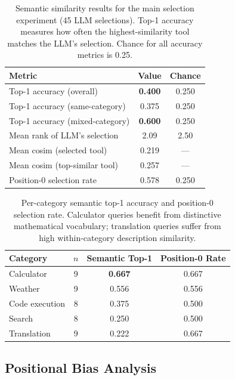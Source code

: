 \begin{table}[t]
\centering
\caption{Semantic similarity results for the main selection experiment (45 LLM selections).
         Top-1 accuracy measures how often the highest-similarity tool matches the LLM's
         selection.  Chance for all accuracy metrics is 0.25.}
\label{tab:semantic_overall}
\begin{tabular}{@{}lcc@{}}
\toprule
\textbf{Metric} & \textbf{Value} & \textbf{Chance} \\
\midrule
Top-1 accuracy (overall)          & \textbf{0.400} & 0.250 \\
Top-1 accuracy (same-category)    & 0.375          & 0.250 \\
Top-1 accuracy (mixed-category)   & \textbf{0.600} & 0.250 \\
Mean rank of LLM's selection      & 2.09           & 2.50  \\
Mean cosim (selected tool)        & 0.219          & ---   \\
Mean cosim (top-similar tool)     & 0.257          & ---   \\
Position-0 selection rate         & 0.578          & 0.250 \\
\bottomrule
\end{tabular}
\end{table}

\begin{table}[t]
\centering
\caption{Per-category semantic top-1 accuracy and position-0 selection rate.
         Calculator queries benefit from distinctive mathematical vocabulary;
         translation queries suffer from high within-category description similarity.}
\label{tab:per_category}
\begin{tabular}{@{}lccc@{}}
\toprule
\textbf{Category} & \textbf{$n$} & \textbf{Semantic Top-1} & \textbf{Position-0 Rate} \\
\midrule
Calculator      & 9 & \textbf{0.667} & 0.667 \\
Weather         & 9 & 0.556          & 0.556 \\
Code execution  & 8 & 0.375          & 0.500 \\
Search          & 8 & 0.250          & 0.500 \\
Translation     & 9 & 0.222          & 0.667 \\
\bottomrule
\end{tabular}
\end{table}

\subsection{Positional Bias Analysis}
\label{sec:res_pos}

